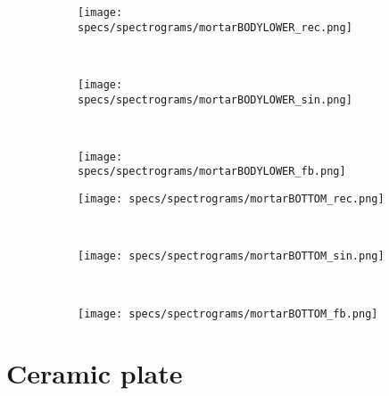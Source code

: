 \begin{figure}
	\centering    
    \begin{subfigure}[b]{0.25\textwidth}
        \texttt{[image: specs/spectrograms/mortarBODYLOWER\_rec.png]}
    \end{subfigure}%
    ~ %
    \begin{subfigure}[b]{0.25\textwidth}
        \texttt{[image: specs/spectrograms/mortarBODYLOWER\_sin.png]}
    \end{subfigure}%
    ~ %
    \begin{subfigure}[b]{0.25\textwidth}
        \texttt{[image: specs/spectrograms/mortarBODYLOWER\_fb.png]}
    \end{subfigure}%
      
    \begin{subfigure}[b]{0.25\textwidth}
        \texttt{[image: specs/spectrograms/mortarBOTTOM\_rec.png]}
    \end{subfigure}%
    ~ %
    \begin{subfigure}[b]{0.25\textwidth}
        \texttt{[image: specs/spectrograms/mortarBOTTOM\_sin.png]}
    \end{subfigure}%
    ~ %
    \begin{subfigure}[b]{0.25\textwidth}
        \texttt{[image: specs/spectrograms/mortarBOTTOM\_fb.png]}
    \end{subfigure}%
    \label{fig:spectrograms}
\end{figure}

\section*{Ceramic plate}

